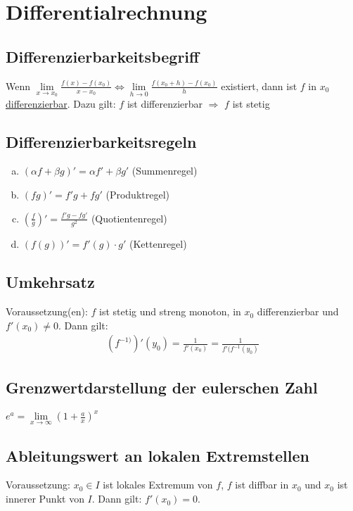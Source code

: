 \section{Differentialrechnung}

\subsection{Differenzierbarkeitsbegriff}
Wenn $\lim \limits_{x \to x_0} \frac{f(x) - f(x_0)}{x - x_0}\Leftrightarrow \lim \limits_{h \to 0} \frac{f(x_0 + h) - f(x_0)}{h}$ existiert,
dann ist $f$ in $x_0$ \underline{differenzierbar}. Dazu gilt: $f$ ist differenzierbar $\Rightarrow$ $f$ ist stetig

\subsection{Differenzierbarkeitsregeln}
\begin{enumerate}[a)]
    \item $(\alpha f + \beta g)' = \alpha f' + \beta g'$ (Summenregel)
    \item $(fg)' = f'g + fg'$ (Produktregel)
    \item $(\frac{f}{g})' = \frac{f'g - fg'}{g^2}$ (Quotientenregel)
    \item $(f(g))' = f'(g) \cdot g'$ (Kettenregel)
\end{enumerate}

\subsection{Umkehrsatz}
Voraussetzung(en): $f$ ist stetig und streng monoton, in $x_0$ differenzierbar und $f'(x_0) \neq 0$. Dann gilt: \\
\begin{align*}
    (f^{-1)})'(y_0) = \frac{1}{f'(x_0)} = \frac{1}{f'(f^{-1}(y_0)}
\end{align*}

\subsection{Grenzwertdarstellung der eulerschen Zahl}
$e^{a} = \lim \limits_{x \to \infty} (1 + \frac{a}{x})^x$

\subsection{Ableitungswert an lokalen Extremstellen}
Voraussetzung: $x_0 \in I$ ist lokales Extremum von $f$, $f$ ist diffbar in $x_0$ und $x_0$ ist innerer Punkt von $I$. Dann gilt: $f'(x_0) = 0$.

